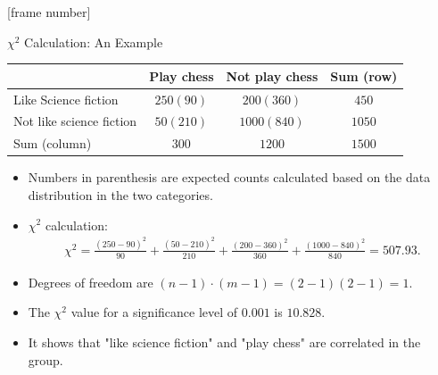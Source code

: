 \documentclass[aspectratio=169,t]{beamer}
\begin{document}
  {
    [frame number]
    \begin{frame}{$\chi^2$ Calculation: An Example}
    \centering
    \begin{tabular}{l|c|c|c|}
    & Play chess & Not play chess & Sum (row)\\\hline
    Like Science fiction & $250 (90)$ & $200 (360)$ & $450$ \\\hline
    Not like science fiction & $50 (210)$ & $1000 (840)$ & $1050$\\\hline
    Sum (column) & $300$ & $1200$ & $1500$\\\hline
    \end{tabular}
    \begin{itemize}
      \item Numbers in parenthesis are expected counts calculated based on the data distribution in the two categories.
      \item $\chi^2$ calculation:
      \begin{align}
      \chi^2 = \frac{(250-90)^2}{90} + \frac{(50-210)^2}{210} + \frac{(200-360)^2}{360} + \frac{(1000-840)^2}{840} = 507.93.
      \end{align}
      \item Degrees of freedom are $(n-1)\cdot(m-1) = (2-1)(2-1) = 1$.
      \item The $\chi^2$ value for a significance level of $0.001$ is $10.828$.
      \item It shows that "like science fiction" and "play chess" are correlated in the group.
    \end{itemize}
    \end{frame}
  }
\end{document}
